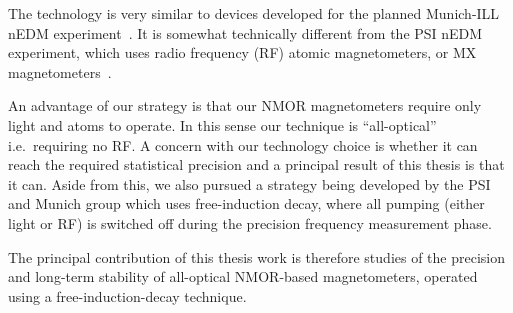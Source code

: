 
The technology is very similar to devices developed for the planned
Munich-ILL nEDM experiment~\cite{bib:michi-thesis}.  It is somewhat
technically different from the PSI nEDM experiment, which uses radio
frequency (RF) atomic magnetometers, or MX
magnetometers~\cite{Groeger2006}.

An advantage of our strategy is that our NMOR magnetometers require
only light and atoms to operate.  In this sense our technique is
``all-optical'' i.e.~requiring no RF.  A concern with our technology
choice is whether it can reach the required statistical precision and
a principal result of this thesis is that it can.  Aside from this, we
also pursued a strategy being developed by the PSI and Munich group
which uses free-induction decay, where all pumping (either light or
RF) is switched off during the precision frequency measurement phase.






The principal contribution of this thesis work is therefore studies of
the precision and long-term stability of all-optical NMOR-based
magnetometers, operated using a free-induction-decay technique.

